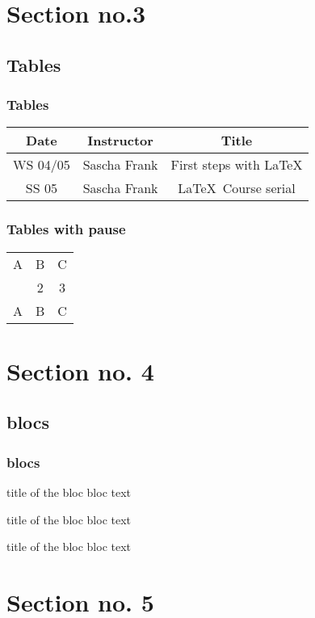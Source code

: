 \section{Section no.3} 
\subsection{Tables}
\begin{frame}\frametitle{Tables}
\begin{tabular}{|c|c|c|}
\hline
\textbf{Date} & \textbf{Instructor} & \textbf{Title} \\
\hline
WS 04/05 & Sascha Frank & First steps with  \LaTeX  \\
\hline
SS 05 & Sascha Frank & \LaTeX \ Course serial \\
\hline
\end{tabular}
\end{frame}


\begin{frame}\frametitle{Tables with pause}
\begin{tabular}{c c c}
A & B & C \\ 
\pause 
1 & 2 & 3 \\  
\pause 
A & B & C \\ 
\end{tabular} 
\end{frame}


\section{Section no. 4}
\subsection{blocs}
\begin{frame}\frametitle{blocs}

\begin{block}{title of the bloc}
bloc text
\end{block}

\begin{exampleblock}{title of the bloc}
bloc text
\end{exampleblock}


\begin{alertblock}{title of the bloc}
bloc text
\end{alertblock}
\end{frame}

\section{Section no. 5}
